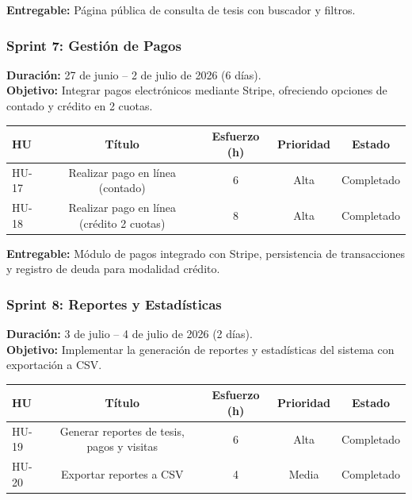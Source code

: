 \textbf{Entregable:} Página pública de consulta de tesis con buscador y filtros.

\subsubsection{Sprint 7: Gestión de Pagos}
\label{sprint:7}

\textbf{Duración:} 27 de junio – 2 de julio de 2026 (6 días). \\
\textbf{Objetivo:} Integrar pagos electrónicos mediante Stripe, ofreciendo opciones de contado y crédito en 2 cuotas.

\begin{center}
\begin{tabular}{lcccc}
\toprule
\textbf{HU} & \textbf{Título} & \textbf{Esfuerzo (h)} & \textbf{Prioridad} & \textbf{Estado} \\
\midrule
HU-17 & Realizar pago en línea (contado) & 6 & Alta & Completado \\
HU-18 & Realizar pago en línea (crédito 2 cuotas) & 8 & Alta & Completado \\
\bottomrule
\end{tabular}
\end{center}

\textbf{Entregable:} Módulo de pagos integrado con Stripe, persistencia de transacciones y registro de deuda para modalidad crédito.

\subsubsection{Sprint 8: Reportes y Estadísticas}
\label{sprint:8}

\textbf{Duración:} 3 de julio – 4 de julio de 2026 (2 días). \\
\textbf{Objetivo:} Implementar la generación de reportes y estadísticas del sistema con exportación a CSV.

\begin{center}
\begin{tabular}{lcccc}
\toprule
\textbf{HU} & \textbf{Título} & \textbf{Esfuerzo (h)} & \textbf{Prioridad} & \textbf{Estado} \\
\midrule
HU-19 & Generar reportes de tesis, pagos y visitas & 6 & Alta & Completado \\
HU-20 & Exportar reportes a CSV & 4 & Media & Completado \\
\bottomrule
\end{tabular}
\end{center}

